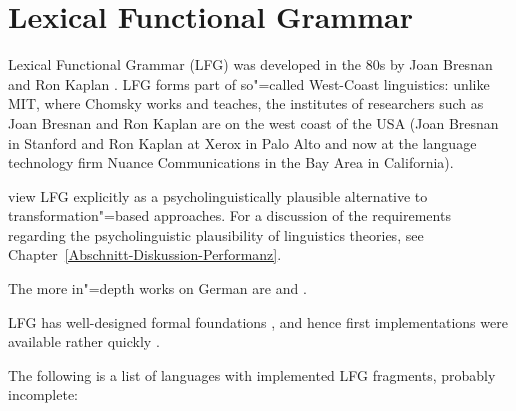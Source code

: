 
\chapter{Lexical Functional Grammar}
\label{Kapitel-LFG}\label{chap-lfg}


Lexical Functional Grammar (LFG) was developed in the 80s by Joan Bresnan and Ron Kaplan \citep{BK82a}. LFG forms part of
so"=called West-Coast linguistics: unlike MIT, where Chomsky works and teaches, the institutes of researchers such as Joan
Bresnan and Ron Kaplan are on the west coast of the USA (Joan Bresnan in Stanford and Ron Kaplan at Xerox in Palo Alto and now at the language technology firm
Nuance Communications in the Bay Area in California).


\citet{BK82a} view LFG explicitly as a psycholinguistically plausible alternative to transformation"=based approaches. For a discussion of
the requirements regarding the psycholinguistic plausibility of linguistics theories, see Chapter~\ref{Abschnitt-Diskussion-Performanz}. 

The more in"=depth works on German are  and .

LFG has well-designed formal foundations \citep{KB82a-u,Kaplan89b}, and hence first implementations
were available rather quickly \citep*{FR83b,FR83a,Yasukawa1984a-u,BH86a-u,%
ED86a-u,%
WA86a-u,%
Delmonte90a-u,%
HHP91a-u,%
Kohl92a-u,KGPRM92a-u,%
KM96a-u,%
Mayo97a-u,Mayo99a-u,%
BS2005b-u,BSagot2005a-u,%
Clement2009a-u,CK2001a-u%
}. 

The following is a list of languages with implemented LFG fragments, probably incomplete:
%
%
%
%
%




